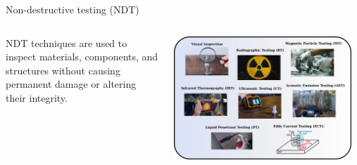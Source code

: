 \documentclass[10pt,aspectratio=169,dvipsnames]{beamer} %
\begin{document}
	\begin{frame}{Non-destructive testing (NDT)}
		\begin{columns}[T]
			\begin{column}[c]{.35\textwidth}
				\justifying
				NDT techniques are used to inspect materials, components, and structures without causing permanent damage or altering their integrity. 
			\end{column}
			\begin{column}[c]{.65\textwidth}
				\includegraphics[width=0.95\textwidth]{NDT.png}
			\end{column}
		\end{columns}
	\end{frame}
\end{document}
